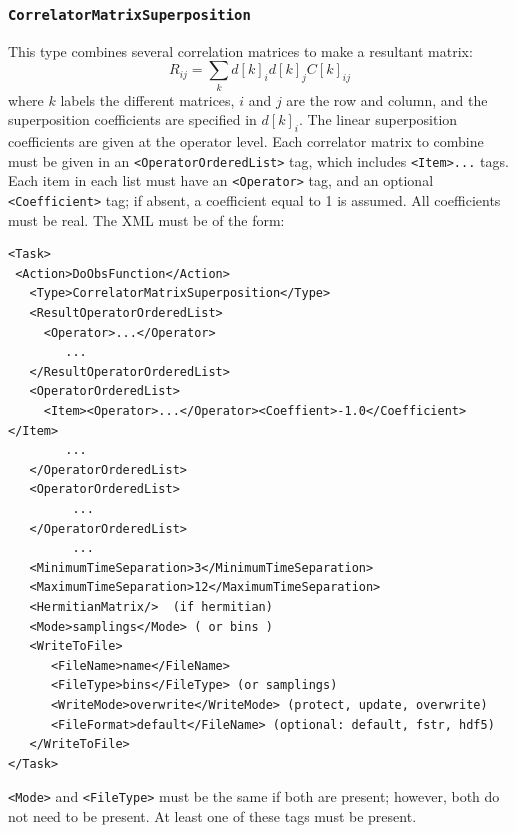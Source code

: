 \documentclass[12pt]{article}
\newcommand{\vb}{\texttt}
\begin{document}
\subsubsection{\vb{CorrelatorMatrixSuperposition}}
This type combines several correlation
matrices to make a resultant matrix:
\[
R_{i j} = \sum_k  d[k]_i d[k]_j  C[k]_{i j}
\]
where $k$ labels the different matrices, $i$ and $j$ are the row and column,
and the superposition coefficients are specified in $d[k]_i$.
The linear superposition coefficients are given at the operator
level.  Each correlator matrix to combine must be given in an
\vb{<OperatorOrderedList>} tag, which includes \vb{<Item>...} tags.  Each
item in each list must have an \vb{<Operator>} tag, and an optional
\vb{<Coefficient>} tag; if absent, a coefficient equal to 1 is assumed.
All coefficients must be real.
The XML must be of the form:
\begin{verbatim}
<Task>
 <Action>DoObsFunction</Action>
   <Type>CorrelatorMatrixSuperposition</Type>
   <ResultOperatorOrderedList>
     <Operator>...</Operator>
        ...
   </ResultOperatorOrderedList>
   <OperatorOrderedList>
     <Item><Operator>...</Operator><Coeffient>-1.0</Coefficient></Item>
        ...
   </OperatorOrderedList>
   <OperatorOrderedList>
         ...
   </OperatorOrderedList>
         ...
   <MinimumTimeSeparation>3</MinimumTimeSeparation>
   <MaximumTimeSeparation>12</MaximumTimeSeparation>
   <HermitianMatrix/>  (if hermitian)
   <Mode>samplings</Mode> ( or bins )
   <WriteToFile>
      <FileName>name</FileName>
      <FileType>bins</FileType> (or samplings)
      <WriteMode>overwrite</WriteMode> (protect, update, overwrite)
      <FileFormat>default</FileName> (optional: default, fstr, hdf5)
   </WriteToFile>
</Task>
\end{verbatim}
\vb{<Mode>} and \vb{<FileType>} must be the same if both are present;
however, both do not need to be present.  At least one of these tags must 
be present.
\end{document}
